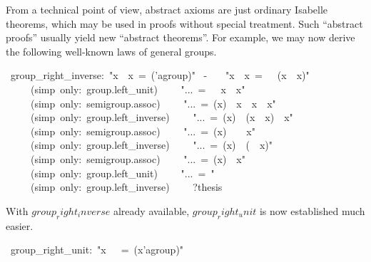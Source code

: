 \begin{isabelle}
\begin{isamarkuptext}
 \medskip From a technical point of view, abstract axioms are just
 ordinary Isabelle theorems, which may be used in proofs without
 special treatment.  Such ``abstract proofs'' usually yield new
 ``abstract theorems''.  For example, we may now derive the following
 well-known laws of general groups.%
\end{isamarkuptext}%
~group\_right\_inverse:~{"}x~{\isasymOtimes}~x{\isasyminv}~=~({\isasymunit}{\isasymColon}'a{\isasymColon}group){"}\isanewline
{}~-\isanewline
~~~{"}x~{\isasymOtimes}~x{\isasyminv}~=~{\isasymunit}~{\isasymOtimes}~(x~{\isasymOtimes}~x{\isasyminv}){"}\isanewline
~~~~~(simp~only:~group.left\_unit)\isanewline
~~~~{"}...~=~{\isasymunit}~{\isasymOtimes}~x~{\isasymOtimes}~x{\isasyminv}{"}\isanewline
~~~~~(simp~only:~semigroup.assoc)\isanewline
~~~~{"}...~=~(x{\isasyminv}){\isasyminv}~{\isasymOtimes}~x{\isasyminv}~{\isasymOtimes}~x~{\isasymOtimes}~x{\isasyminv}{"}\isanewline
~~~~~(simp~only:~group.left\_inverse)\isanewline
~~~~{"}...~=~(x{\isasyminv}){\isasyminv}~{\isasymOtimes}~(x{\isasyminv}~{\isasymOtimes}~x)~{\isasymOtimes}~x{\isasyminv}{"}\isanewline
~~~~~(simp~only:~semigroup.assoc)\isanewline
~~~~{"}...~=~(x{\isasyminv}){\isasyminv}~{\isasymOtimes}~{\isasymunit}~{\isasymOtimes}~x{\isasyminv}{"}\isanewline
~~~~~(simp~only:~group.left\_inverse)\isanewline
~~~~{"}...~=~(x{\isasyminv}){\isasyminv}~{\isasymOtimes}~({\isasymunit}~{\isasymOtimes}~x{\isasyminv}){"}\isanewline
~~~~~(simp~only:~semigroup.assoc)\isanewline
~~~~{"}...~=~(x{\isasyminv}){\isasyminv}~{\isasymOtimes}~x{\isasyminv}{"}\isanewline
~~~~~(simp~only:~group.left\_unit)\isanewline
~~~~{"}...~=~{\isasymunit}{"}\isanewline
~~~~~(simp~only:~group.left\_inverse)\isanewline
~~~~?thesis~\isanewline
{}%
\begin{isamarkuptext}%
\noindent With $group_right_inverse$ already available,
 $group_right_unit$\label{thm:group-right-unit} is now established
 much easier.%
\end{isamarkuptext}%
~group\_right\_unit:~{"}x~{\isasymOtimes}~{\isasymunit}~=~(x{\isasymColon}'a{\isasymColon}group){"}\isanewline

\end{isabelle}
